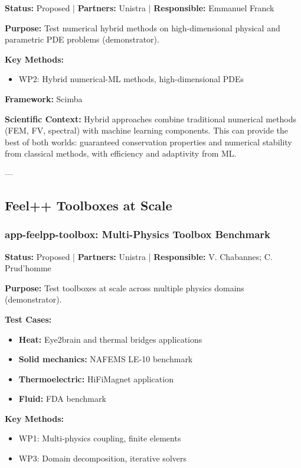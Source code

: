 \textbf{Status:} Proposed | \textbf{Partners:} Unistra | \textbf{Responsible:} Emmanuel Franck

\textbf{Purpose:} Test numerical hybrid methods on high-dimensional physical and parametric PDE problems (demonstrator).

\textbf{Key Methods:}
\begin{itemize}
\item WP2: Hybrid numerical-ML methods, high-dimensional PDEs
\end{itemize}

\textbf{Framework:} Scimba

\textbf{Scientific Context:} Hybrid approaches combine traditional numerical methods (FEM, FV, spectral) with machine learning components. This can provide the best of both worlds: guaranteed conservation properties and numerical stability from classical methods, with efficiency and adaptivity from ML.

---

\subsection{Feel++ Toolboxes at Scale}

\subsubsection{app-feelpp-toolbox: Multi-Physics Toolbox Benchmark}
\label{sec:app:specs:app-feelpp-toolbox}

\textbf{Status:} Proposed | \textbf{Partners:} Unistra | \textbf{Responsible:} V. Chabannes; C. Prud'homme

\textbf{Purpose:} Test \Feelpp toolboxes at scale across multiple physics domains (demonstrator).

\textbf{Test Cases:}
\begin{itemize}
\item \textbf{Heat:} Eye2brain and thermal bridges applications
\item \textbf{Solid mechanics:} NAFEMS LE-10 benchmark
\item \textbf{Thermoelectric:} HiFiMagnet application
\item \textbf{Fluid:} FDA benchmark
\end{itemize}

\textbf{Key Methods:}
\begin{itemize}
\item WP1: Multi-physics coupling, finite elements
\item WP3: Domain decomposition, iterative solvers
\end{itemize}

